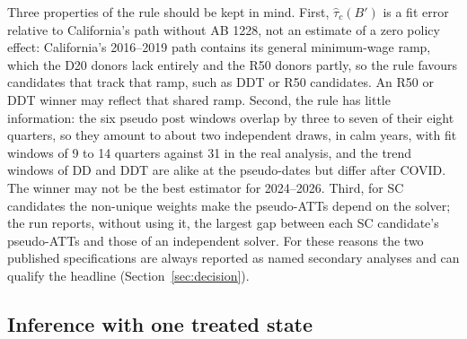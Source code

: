 Three properties of the rule should be kept in mind. First, $\hat\tau_c(B')$ is a fit error relative
to California's path without AB 1228, not an estimate of a zero policy effect: California's
2016--2019 path contains its general minimum-wage ramp, which the D20 donors lack entirely and the
R50 donors partly, so the rule favours candidates that track that ramp, such as DDT or R50
candidates. An R50 or DDT winner may reflect that shared ramp. Second, the rule has little
information: the six pseudo post windows overlap by three to seven of their eight quarters, so they
amount to about two independent draws, in calm years, with fit windows of 9 to 14 quarters against
31 in the real analysis, and the trend windows of DD and DDT are alike at the pseudo-dates but differ
after COVID. The winner may not be the best estimator for 2024--2026. Third, for SC candidates the
non-unique weights make the pseudo-ATTs depend on the solver; the run reports, without using it,
the largest gap between each SC candidate's pseudo-ATTs and those of an independent solver. For
these reasons the two published specifications are always reported as named secondary analyses and
can qualify the headline (Section~\ref{sec:decision}).

\subsection{Inference with one treated state}
\label{sec:inference}

